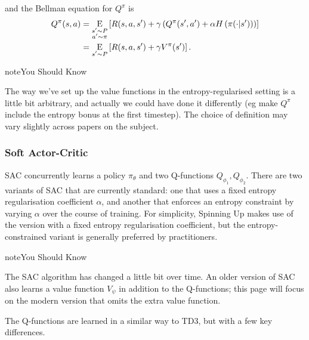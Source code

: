 \documentclass[letterpaper,10pt,english]{sphinxmanual}
\newcommand{\E}{{\mathrm E}}
\newcommand{\underE}[2]{\underset{\begin{subarray}{c}#1 \end{subarray}}{\E}\left[ #2 \right]}
\begin{document}
and the Bellman equation for \(Q^{\pi}\) is
\begin{equation*}
\begin{split}Q^{\pi}(s,a) &= \underE{s' \sim P \\ a' \sim \pi}{R(s,a,s') + \gamma\left(Q^{\pi}(s',a') + \alpha H\left(\pi(\cdot|s')\right) \right)} \\
&= \underE{s' \sim P}{R(s,a,s') + \gamma V^{\pi}(s')}.\end{split}
\end{equation*}
\begin{sphinxadmonition}{note}{You Should Know}

The way we’ve set up the value functions in the entropy-regularised setting is a little bit arbitrary, and actually we could have done it differently (eg make \(Q^{\pi}\) include the entropy bonus at the first timestep). The choice of definition may vary slightly across papers on the subject.
\end{sphinxadmonition}


\subsubsection{Soft Actor-Critic}
\label{\detokenize{algorithms/lac:soft-actor-critic}}
SAC concurrently learns a policy \(\pi_{\theta}\) and two Q-functions \(Q_{\phi_1}, Q_{\phi_2}\). There are two variants of SAC that are currently standard: one that uses a fixed entropy regularisation coefficient \(\alpha\), and another that enforces an entropy constraint by varying \(\alpha\) over the course of training. For simplicity, Spinning Up makes use of the version with a fixed entropy regularisation coefficient, but the entropy-constrained variant is generally preferred by practitioners.

\begin{sphinxadmonition}{note}{You Should Know}

The SAC algorithm has changed a little bit over time. An older version of SAC also learns a value function \(V_{\psi}\) in addition to the Q-functions; this page will focus on the modern version that omits the extra value function.
\end{sphinxadmonition}

 The Q-functions are learned in a similar way to TD3, but with a few key differences.
\end{document}
